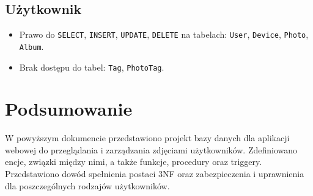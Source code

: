 \documentclass[12pt,a4paper]{article}
\begin{document}
\subsection{Użytkownik}
\begin{itemize}
    \item Prawo do \texttt{SELECT}, \texttt{INSERT}, \texttt{UPDATE}, \texttt{DELETE} na tabelach: \texttt{User}, \texttt{Device}, \texttt{Photo}, \texttt{Album}.
    \item Brak dostępu do tabel: \texttt{Tag}, \texttt{PhotoTag}.
\end{itemize}

\section{Podsumowanie}
W powyższym dokumencie przedstawiono projekt bazy danych dla aplikacji webowej do przeglądania i zarządzania zdjęciami użytkowników. Zdefiniowano encje, związki między nimi, a także funkcje, procedury oraz triggery. Przedstawiono dowód spełnienia postaci 3NF oraz zabezpieczenia i uprawnienia dla poszczególnych rodzajów użytkowników.
\end{document}
